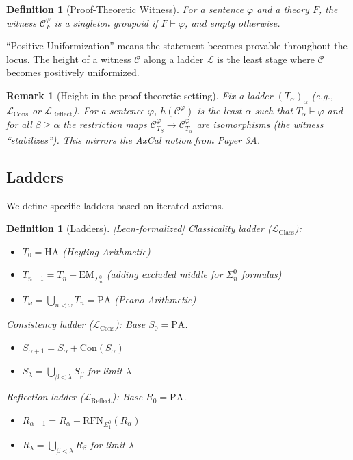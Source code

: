 \documentclass[11pt]{article}
\newtheorem{definition}[theorem]{Definition}
\newtheorem{remark}[theorem]{Remark}
\newcommand{\PA}{\mathrm{PA}}
\newcommand{\HA}{\mathrm{HA}}
\newcommand{\Con}{\mathrm{Con}}
\newcommand{\RFNSigOne}{\mathrm{RFN}_{\Sigma^0_1}}
\newcommand{\LCons}{\mathcal{L}_{\mathrm{Cons}}}
\newcommand{\LReflect}{\mathcal{L}_{\mathrm{Reflect}}}
\newcommand{\LClass}{\mathcal{L}_{\mathrm{Class}}}
\newcommand{\EM}{\mathrm{EM}}
\newcommand{\leanok}{\textsf{\textcolor{green!70!black}{[Lean-formalized]}}}
\begin{document}
\begin{definition}[Proof-Theoretic Witness]
For a sentence $\varphi$ and a theory $F$, the witness $\mathcal C^\varphi_F$ is a singleton groupoid if $F\vdash \varphi$, and empty otherwise.
\end{definition}

``Positive Uniformization'' means the statement becomes provable throughout the locus. The height of a witness $\mathcal{C}$ along a ladder $\mathcal{L}$ is the least stage where $\mathcal{C}$ becomes positively uniformized.

\begin{remark}[Height in the proof-theoretic setting]
Fix a ladder $(T_\alpha)_\alpha$ (e.g., $\LCons$ or $\LReflect$). For a sentence $\varphi$, $h(\mathcal C^\varphi)$ is the least $\alpha$ such that $T_\alpha \vdash \varphi$ and for all $\beta\ge \alpha$ the restriction maps $\mathcal C^\varphi_{T_\beta}\to \mathcal C^\varphi_{T_\alpha}$ are isomorphisms (the witness ``stabilizes''). This mirrors the AxCal notion from Paper 3A.
\end{remark}

\subsection{Ladders}

We define specific ladders based on iterated axioms.

\begin{definition}[Ladders] \leanok
\emph{Classicality ladder ($\LClass$):} 
\begin{itemize}
\item $T_0 = \HA$ (Heyting Arithmetic)
\item $T_{n+1} = T_n + \EM_{\Sigma^0_n}$ (adding excluded middle for $\Sigma^0_n$ formulas)
\item $T_\omega = \bigcup_{n<\omega} T_n = \PA$ (Peano Arithmetic)
\end{itemize}

\emph{Consistency ladder ($\LCons$):} Base $S_0=\PA$.
\begin{itemize}
\item $S_{\alpha+1} = S_\alpha + \Con(S_\alpha)$
\item $S_\lambda = \bigcup_{\beta<\lambda} S_\beta$ for limit $\lambda$
\end{itemize}

\emph{Reflection ladder ($\LReflect$):} Base $R_0=\PA$.
\begin{itemize}
\item $R_{\alpha+1} = R_\alpha + \RFNSigOne(R_\alpha)$
\item $R_\lambda = \bigcup_{\beta<\lambda} R_\beta$ for limit $\lambda$
\end{itemize}
\end{definition}
\end{document}

